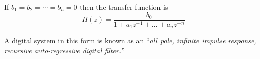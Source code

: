 If $b_1 = b_2 = \cdots = b_n = 0$ then the transfer function is
\[H(z) = \frac{b_0}{1 + a_1z^{-1} + \ldots + a_n z^{-n}}\]

A digital system in this form is known as an ``\emph{all pole,
infinite impulse response, recursive auto-regressive digital
filter.}''
\endinput
